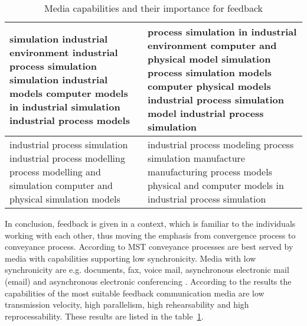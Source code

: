 \documentclass[conference]{IEEEtran}
\begin{document}
\begin{table}[!h]
\renewcommand{\arraystretch}{1.3}
\caption{Media capabilities and their importance for feedback}
\label{table:capabilities}
\centering
\begin{tabular}{|p{3cm}|p{3cm}}
simulation industrial environment \newline
industrial process simulation \newline
simulation industrial models \newline
computer models in industrial simulation \newline
industrial process models & 

process simulation in industrial environment \newline
computer and physical model simulation \newline
process simulation models \newline
computer physical models industrial process simulation \newline
model industrial process simulation

\\ 

\hline

industrial process simulation \newline
industrial process modelling \newline
process modelling and simulation \newline
computer and physical simulation models

& 

industrial process modeling \newline
process simulation manufacture \newline
manufacturing process models \newline
physical and computer models in industrial process simulation

\end{tabular}
\end{table}

In conclusion, feedback is given in a context, which is familiar to the individuals working with each other, thus moving the emphasis from convergence process to conveyance process. According to MST conveyance processes are best served by media with capabilities supporting low synchronicity. Media with low synchronicity are e.g. documents, fax, voice mail, asynchronous electronic mail (email) and asynchronous electronic conferencing \cite{2008dennis}. According to the results the capabilities of the most suitable feedback communication media are low transmission velocity, high parallelism, high rehearsability and high reprocessability. These results are listed in the table~\ref{table:capabilities}.
\end{document}
